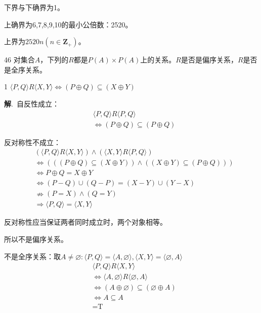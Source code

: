 \documentclass[12pt]{article}
\newenvironment{firstlayer}%
{\begin{list}{}{\renewcommand{\makelabel}[1]{\textbf{##1}.\hfil}
}}
{\end{list}}
\newenvironment{secondlayer}%
{\begin{list}{}{\renewcommand{\makelabel}[1]{(##1)\hfil}
}}
{\end{list}}
\providecommand{\sol}{\textbf{解}.~}
\begin{document}
\begin{CJK}{UTF8}{gbsn}
\begin{firstlayer}

下界与下确界为1。

上确界为6,7,8,9,10的最小公倍数：2520。

上界为$2520n(n\in \mathbf{Z}_+)$。
\item[46] 对集合$A$，下列的$R$都是$P(A)\times P(A)$上的关系。$R$是否是偏序关系，$R$是否是全序关系。
\begin{secondlayer}
  \item[1]$\langle P,Q\rangle R\langle X,Y\rangle \Leftrightarrow (P \oplus Q)\subseteq (X \oplus Y)$

\sol 自反性成立：
\begin{align*}
&\langle P,Q\rangle R\langle P,Q\rangle \\ 
&\Leftrightarrow (P \oplus Q)\subseteq (P \oplus Q)
\end{align*}

反对称性不成立：\begin{align*}
          &(\langle P,Q\rangle R\langle X,Y\rangle)\wedge(\langle X,Y\rangle R\langle P,Q\rangle) \\
          &\Leftrightarrow (((P \oplus Q)\subseteq (X \oplus Y))\wedge ((X \oplus Y)\subseteq (P \oplus Q))) \\
          &\Leftrightarrow P \oplus Q=X \oplus Y\\
          &\Leftrightarrow (P-Q)\cup(Q-P)=(X-Y)\cup(Y-X)\\
          &\nRightarrow (P=X)\wedge(Q=Y)\\
          &\Rightarrow \langle P,Q\rangle=\langle X,Y\rangle
        \end{align*}

反对称性应当保证两者同时成立时，两个对象相等。

所以不是偏序关系。

不是全序关系：取$A\neq \varnothing:\langle P,Q\rangle=\langle A,\varnothing \rangle,\langle X,Y\rangle = \langle \varnothing,A\rangle$
\begin{align*}
&\langle P,Q\rangle R\langle X,Y\rangle\\
&\Leftrightarrow \langle A,\varnothing \rangle R\langle \varnothing,A\rangle\\
&\Leftrightarrow (A \oplus \varnothing)\subseteq (\varnothing \oplus A)\\
&\Leftrightarrow A\subseteq A\\
&=\text{T}
\end{align*}


\end{secondlayer}
\end{firstlayer}
\end{CJK}
\end{document}
